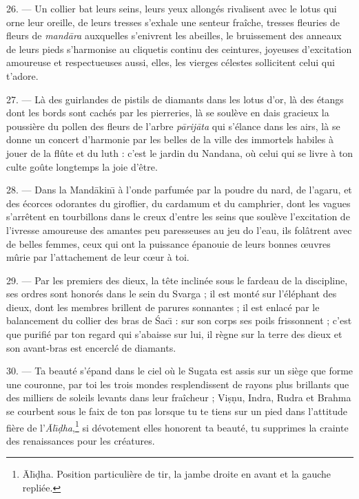 \documentclass[a4paper, 11pt, oneside, french, landscape, twocolumn]{article}
\begin{document}
26. --- Un collier bat leurs seins, leurs yeux allongés rivalisent avec le lotus qui orne leur oreille, de leurs tresses s'exhale une senteur fraîche, tresses fleuries de fleurs de \emph{mand\={a}ra} auxquelles s'enivrent les abeilles, le bruissement des anneaux de leurs pieds s'harmonise au cliquetis continu des ceintures, joyeuses d'excitation amoureuse et respectueuses aussi, elles, les vierges célestes sollicitent celui qui t'adore.

27. --- Là des guirlandes de pistils de diamants dans les lotus d'or, là des étangs dont les bords sont cachés par les pierreries, là se soulève en dais gracieux la poussière du pollen des fleurs de l'arbre \emph{p\={a}rij\={a}ta} qui s'élance dans les airs, là se donne un concert d'harmonie par les belles de la ville des immortels habiles à jouer de la flûte et du luth : c'est le jardin du Nandana, où celui qui se livre à ton culte goûte longtemps la joie d'être.

28. --- Dans la Mand\={a}kin\={\i} à l'onde parfumée par la poudre du nard, de l'agaru, et des écorces odorantes du giroflier, du cardamum et du camphrier, dont les vagues s'arrêtent en tourbillons dans le creux d'entre les seins que soulève l'excitation de l'ivresse amoureuse des amantes peu paresseuses au jeu do l'eau, ils folâtrent avec de belles femmes, ceux qui ont la puissance épanouie de leurs bonnes œuvres mûrie par l'attachement de leur cœur à toi.

29. --- Par les premiers des dieux, la tête inclinée sous le fardeau de la discipline, ses ordres sont honorés dans le sein du Svarga ; il est monté sur l'éléphant des dieux, dont les membres brillent de parures sonnantes ; il est enlacé par le balancement du collier des bras de \'{S}ac\={\i} : sur son corps ses poils frissonnent ; c'est que purifié par ton regard qui s'abaisse sur lui, il règne sur la terre des dieux et son avant-bras est encerclé de diamants.

30. --- Ta beauté s'épand dans le ciel où le Sugata est assis sur un siège que forme une couronne, par toi les trois mondes resplendissent de rayons plus brillants que des milliers de soleils levants dans leur fraîcheur ; Vi\d{s}\d{n}u, Indra, Rudra et Brahma se courbent sous le faix de ton pas lorsque tu te tiens sur un pied dans l'attitude fière de l'\emph{\={A}l\={\i}\d{d}ha},\footnote{\={A}l\={\i}\d{d}ha. Position particulière de tir, la jambe droite en avant et la gauche repliée.} si dévotement elles honorent ta beauté, tu supprimes la crainte des renaissances pour les créatures.
\end{document}
